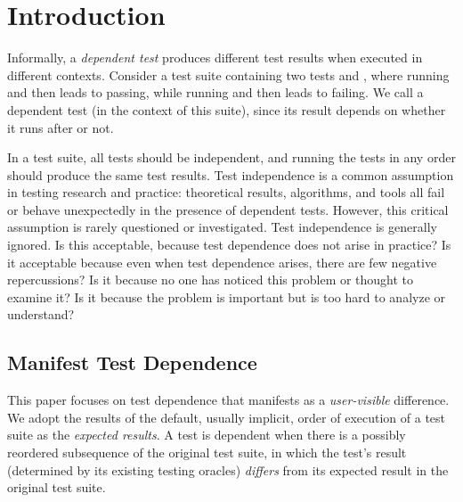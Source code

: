 \section{Introduction}


Informally, a \emph{dependent test} produces different test
results when executed in different contexts. Consider a test
suite containing two tests 
and , where running  and then  leads
to  passing, while running  and then
 leads to  failing. We call 
a dependent test (in the context of this suite), since its result depends on
whether it runs after  or not.


In a test suite, all tests should be independent, and
running the tests in any order should produce the same test results.
Test independence is a common assumption in testing research and practice:
theoretical results, algorithms, and tools all fail or behave unexpectedly
in the presence of dependent tests.
However, this critical assumption is rarely questioned or investigated. Test
independence is generally ignored.
Is this acceptable, because test dependence does
not arise in practice?
Is it acceptable because even when test dependence arises, there are few
negative repercussions?
Is it because no one has noticed this problem or thought to examine it?
Is it because the problem is important but is too hard to analyze or understand?

\subsection{Manifest Test Dependence}


This paper focuses on test dependence that manifests as a \textit{user-visible}
difference. We adopt the results of the default, usually
implicit, order of execution of a test suite as the
\textit{expected results}. A test is dependent when there is a possibly
reordered subsequence of the original test suite, in which
the test's result (determined by its existing testing
oracles) \textit{differs} from its expected result in the
original test suite.

